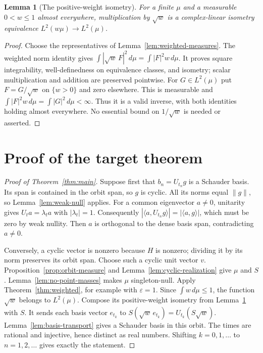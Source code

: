 \documentclass[reqno,a4paper,12pt]{amsart}
\newtheorem{lemma}[theorem]{Lemma}
\theoremstyle{definition}
\newcommand{\ip}[2]{\langle #1,#2\rangle}
\begin{document}
\begin{lemma}[The positive-weight isometry]\label{lem:weight-isometry}
For a finite $\mu$ and a measurable $0<w\le1$ almost everywhere,
multiplication by $\sqrt w$ is a complex-linear isometry equivalence
$L^2(w\mu)\to L^2(\mu)$.
\end{lemma}
\begin{proof}
Choose the representatives of Lemma~\ref{lem:weighted-measures}.
The weighted norm identity gives
$\int|\sqrt w\,F|^2\,d\mu=\int|F|^2w\,d\mu$.
It proves square integrability, well-definedness on equivalence
classes, and isometry; scalar multiplication and addition are
preserved pointwise.
For $G\in L^2(\mu)$ put $F=G/\sqrt w$ on $\{w>0\}$ and zero
elsewhere. This is measurable and
$\int|F|^2w\,d\mu=\int|G|^2\,d\mu<\infty$.
Thus it is a valid inverse, with both identities holding almost
everywhere. No essential bound on $1/\sqrt w$ is needed or asserted.
\end{proof}

\section{Proof of the target theorem}
\begin{proof}[Proof of Theorem~\ref{thm:main}]
Suppose first that $b_n=U_{t_n}g$ is a Schauder basis.
Its span is contained in the orbit span, so $g$ is cyclic.
All its norms equal $\|g\|$, so Lemma~\ref{lem:weak-null} applies.
For a common eigenvector $a\ne0$, unitarity gives
$U_ta=\lambda_ta$ with $|\lambda_t|=1$.
Consequently $|\ip{a}{U_{t_n}g}|=|\ip{a}{g}|$, which must be zero
by weak nullity. Then $a$ is orthogonal to the dense basis span,
contradicting $a\ne0$.

Conversely, a cyclic vector is nonzero because $H$ is nonzero;
dividing it by its norm preserves its orbit span. Choose such a cyclic
unit vector $v$. Proposition~\ref{prop:orbit-measure} and
Lemma~\ref{lem:cyclic-realization} give $\mu$ and $S$.
Lemma~\ref{lem:no-point-masses} makes $\mu$ singleton-null.
Apply Theorem~\ref{thm:weighted}, for example with $\varepsilon=1$.
Since $\int w\,d\mu\le1$, the function $\sqrt w$ belongs to $L^2(\mu)$.
Compose its positive-weight isometry from
Lemma~\ref{lem:weight-isometry} with $S$.
It sends each basis vector $e_{t_k}$ to
$S(\sqrt w\,e_{t_k})=U_{t_k}(S\sqrt w)$.
Lemma~\ref{lem:basis-transport} gives a Schauder basis in this orbit.
The times are rational and injective, hence distinct as real numbers.
Shifting $k=0,1,\ldots$ to $n=1,2,\ldots$ gives exactly the statement.
\end{proof}
\end{document}

